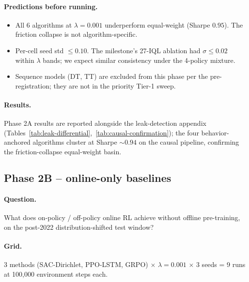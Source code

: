 \paragraph{Predictions before running.}
\begin{itemize}\setlength\itemsep{0pt}
  \item All 6 algorithms at $\lambda{=}0.001$ underperform equal-weight
    (Sharpe $0.95$). The friction collapse is not algorithm-specific.
  \item Per-cell seed std $\le 0.10$. The milestone's 27-IQL ablation
    had $\sigma \le 0.02$ within $\lambda$ bands; we expect similar
    consistency under the 4-policy mixture.
  \item Sequence models (DT, TT) are excluded from this phase per the
    pre-registration; they are not in the priority Tier-1 sweep.
\end{itemize}

\paragraph{Results.} Phase 2A results are reported alongside the
leak-detection appendix (Tables~\ref{tab:leak-differential},~\ref{tab:causal-confirmation});
the four behavior-anchored algorithms cluster at Sharpe $\sim 0.94$ on
the causal pipeline, confirming the friction-collapse equal-weight
basin.

\subsection{Phase 2B -- online-only baselines}
\label{sec:experiments:phase2b}

\paragraph{Question.} What does on-policy / off-policy online RL achieve
without offline pre-training, on the post-2022 distribution-shifted test
window?

\paragraph{Grid.} 3 methods (SAC-Dirichlet, PPO-LSTM, GRPO) $\times$
$\lambda{=}0.001$ $\times$ 3 seeds = 9 runs at 100{,}000 environment
steps each.

